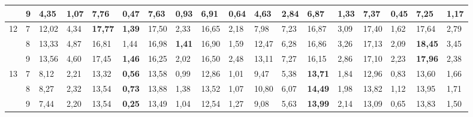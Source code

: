 \documentclass[conference]{IEEEtran}
\begin{document}
\begin{table*}[]
\begin{tabular}{|cl|ll|ll|ll|ll|ll|ll|ll|ll|}
		\multicolumn{1}{|c|}{} & 9 & \multicolumn{1}{l|}{4,35} & 1,07 & \multicolumn{1}{l|}{\textbf{7,76}} & 0,47 & \multicolumn{1}{l|}{7,63} & 0,93 & \multicolumn{1}{l|}{6,91} & 0,64 & \multicolumn{1}{l|}{4,63} & 2,84 & \multicolumn{1}{l|}{6,87} & 1,33 & \multicolumn{1}{l|}{7,37} & \textbf{0,45} & \multicolumn{1}{l|}{7,25} & 1,17 \\ \hline
		\multicolumn{1}{|c|}{\multirow{3}{*}{12}} & 7 & \multicolumn{1}{l|}{12,02} & 4,34 & \multicolumn{1}{l|}{\textbf{17,77}} & \textbf{1,39} & \multicolumn{1}{l|}{17,50} & 2,33 & \multicolumn{1}{l|}{16,65} & 2,18 & \multicolumn{1}{l|}{7,98} & 7,23 & \multicolumn{1}{l|}{16,87} & 3,09 & \multicolumn{1}{l|}{17,40} & 1,62 & \multicolumn{1}{l|}{17,64} & 2,79 \\ \cline{2-18} 
		\multicolumn{1}{|c|}{} & 8 & \multicolumn{1}{l|}{13,33} & 4,87 & \multicolumn{1}{l|}{16,81} & 1,44 & \multicolumn{1}{l|}{16,98} & \textbf{1,41} & \multicolumn{1}{l|}{16,90} & 1,59 & \multicolumn{1}{l|}{12,47} & 6,28 & \multicolumn{1}{l|}{16,86} & 3,26 & \multicolumn{1}{l|}{17,13} & 2,09 & \multicolumn{1}{l|}{\textbf{18,45}} & 3,45 \\ \cline{2-18} 
		\multicolumn{1}{|c|}{} & 9 & \multicolumn{1}{l|}{13,56} & 4,60 & \multicolumn{1}{l|}{17,45} & \textbf{1,46} & \multicolumn{1}{l|}{16,25} & 2,02 & \multicolumn{1}{l|}{16,50} & 2,48 & \multicolumn{1}{l|}{13,11} & 7,27 & \multicolumn{1}{l|}{16,15} & 2,86 & \multicolumn{1}{l|}{17,10} & 2,23 & \multicolumn{1}{l|}{\textbf{17,96}} & 2,38 \\ \hline
		\multicolumn{1}{|c|}{\multirow{3}{*}{13}} & 7 & \multicolumn{1}{l|}{8,12} & 2,21 & \multicolumn{1}{l|}{13,32} & \textbf{0,56} & \multicolumn{1}{l|}{13,58} & 0,99 & \multicolumn{1}{l|}{12,86} & 1,01 & \multicolumn{1}{l|}{9,47} & 5,38 & \multicolumn{1}{l|}{\textbf{13,71}} & 1,84 & \multicolumn{1}{l|}{12,96} & 0,83 & \multicolumn{1}{l|}{13,60} & 1,66 \\ \cline{2-18} 
		\multicolumn{1}{|c|}{} & 8 & \multicolumn{1}{l|}{8,27} & 2,32 & \multicolumn{1}{l|}{13,54} & \textbf{0,73} & \multicolumn{1}{l|}{13,88} & 1,38 & \multicolumn{1}{l|}{13,52} & 1,07 & \multicolumn{1}{l|}{10,80} & 6,07 & \multicolumn{1}{l|}{\textbf{14,49}} & 1,98 & \multicolumn{1}{l|}{13,82} & 1,12 & \multicolumn{1}{l|}{13,95} & 1,71 \\ \cline{2-18} 
		\multicolumn{1}{|c|}{} & 9 & \multicolumn{1}{l|}{7,44} & 2,20 & \multicolumn{1}{l|}{13,54} & \textbf{0,25} & \multicolumn{1}{l|}{13,49} & 1,04 & \multicolumn{1}{l|}{12,54} & 1,27 & \multicolumn{1}{l|}{9,08} & 5,63 & \multicolumn{1}{l|}{\textbf{13,99}} & 2,14 & \multicolumn{1}{l|}{13,09} & 0,65 & \multicolumn{1}{l|}{13,83} & 1,50 \\ \hline

\end{tabular}
\end{table*}
\end{document}

